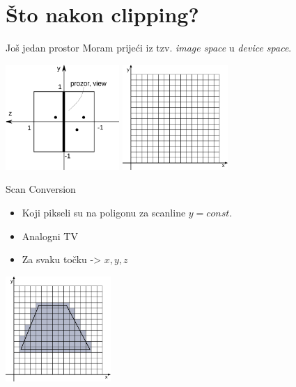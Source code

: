 \documentclass[9pt]{beamer}
\begin{document}
\section{Što nakon clipping?}
\begin{frame}{Još jedan prostor}
	Moram prijeći iz tzv. \textit{image space} u \textit{device space}.
	\begin{center}
		\includegraphics[height=4cm]{slike/img_Space.png}  \quad \quad
		\includegraphics[height=4cm]{slike/device_space.png}
	\end{center}
	
\end{frame}

\begin{frame}{Scan Conversion}
	\begin{itemize}
		\item Koji pikseli su na poligonu za scanline $y = const.$
		\item Analogni TV
		\item Za svaku točku -> $x, y, z$
	\end{itemize}
	\begin{center}
		\includegraphics[height=4cm]{slike/p05_08.png}
	\end{center}
\end{frame}
\end{document}
